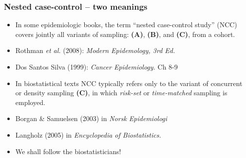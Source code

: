 \documentclass[12pt,dvipsnames,t,handout%
,aspectratio=169%
]{beamer}
\begin{document}
\begin{frame}
\frametitle{Nested case-control -- two meanings}

\begin{itemize}
\item
In some epidemiologic books, the term ``nested case-control study''
 (NCC) covers jointly 
all variants of sampling: {\bf (A)}, {\bf (B)}, and {\bf (C)}, from
 a cohort.
 \pause
\bi
\item[ ]
 Rothman \textit{et al.} (2008): 
  \textit{Modern Epidemology, 3rd Ed.}  
\item[ ]  
  Dos Santos Silva (1999): \textit{Cancer Epidemiology.} Ch 8-9 
\ei  
\bigskip
\pause
\item
In biostatistical texts NCC typically refers only to
the variant of concurrent or density sampling {\bf (C)}, in which 
{\it risk-set} or {\it time-matched} sampling is employed.
 \pause
 \medskip 
 \bi
\item[ ]
Borgan \& Samuelsen (2003) in \textit{Norsk Epidemiologi} 
\item[ ]
 Langholz (2005) in \textit{Encyclopedia of Biostatistics.}
 \ei

\pause
\medskip
 \item
We shall follow the biostatisticians!
\end{itemize}

\end{frame}
\end{document}
